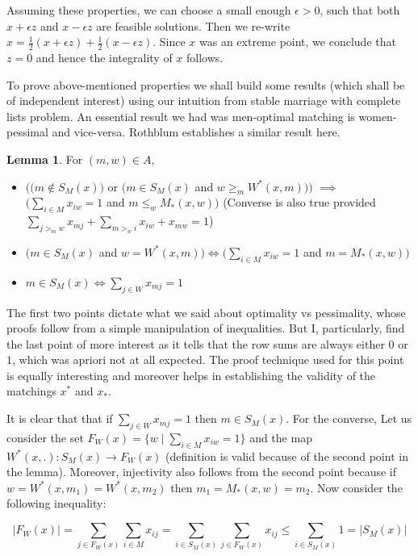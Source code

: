 \documentclass[a4paper,UKenglish,cleveref, autoref]{lipics-v2019}
\theoremstyle{definition}
\newtheorem*{lemma*}{Lemma}
\begin{document}
Assuming these properties, we can choose a small enough $\epsilon > 0$, such that both $x + \epsilon z$ and $x - \epsilon z$ are feasible solutions. Then we re-write $x = \frac{1}{2}(x + \epsilon z) + \frac{1}{2}(x - \epsilon z)$. Since $x$ was an extreme point, we conclude that $z=0$ and hence the integrality of $x$ follows.

To prove above-mentioned properties we shall build some results (which shall be of independent interest) using our intuition from stable marriage with complete lists problem. An essential result we had was men-optimal matching is women-pessimal and vice-versa. Rothblum establishes a similar result here.

\begin{lemma*}
For $(m,w) \in A$,
\begin{itemize}
    \item $\Big( \big(m \not \in S_M(x)\big)$ or $\big(m \in S_M(x)$ and $w \geq_m W^*(x,m)\big) \Big)$ $\implies$ $\Big(\sum_{i \in M} x_{iw} = 1$ and $m \leq_w M_*(x,w)\Big)$ (Converse is also true provided $\sum_{j >_m w} x_{mj} + \sum_{m >_ w i} x_{iw} + x_{mw} = 1$)
    \item $\big( m \in S_M(x)$ and  $w = W^*(x,m) \big) \iff \big( \sum_{i \in M} x_{iw} = 1$ and $m = M_*(x,w) \big)$
    \item $m \in S_M(x) \iff \sum_{j \in W} x_{mj} = 1$
\end{itemize}
\end{lemma*}

The first two points dictate what we said about optimality vs pessimality, whose proofs follow from a simple manipulation of inequalities. But I, particularly, find the last point of more interest as it tells that the row sums are always either $0$ or $1$, which was apriori not at all expected. The proof technique used for this point is equally interesting and moreover helps in establishing the validity of the matchings $x^*$ and $x_*$.

It is clear that that if $\sum_{j \in W} x_{mj} = 1$ then $m \in S_M(x)$. For the converse, Let us consider the set $F_W(x) = \{w \mid \sum_{i \in M} x_{iw}=1\}$ and the map $W^*(x,.) : S_M(x) \rightarrow F_W(x)$ (definition is valid because of the second point in the lemma). Moreover, injectivity also follows from the second point because if $w=W^*(x,m_1)=W^*(x,m_2)$ then $m_1 = M_*(x,w) = m_2$. Now consider the following inequality:

$$|F_W(x)| = \sum_{j \in F_W(x)} \sum_{i \in M} x_{ij} = \sum_{i \in S_M(x)} \sum_{j \in F_W(x)} x_{ij} \leq \sum_{i \in S_M(x)} 1 = |S_M(x)|$$
\end{document}
